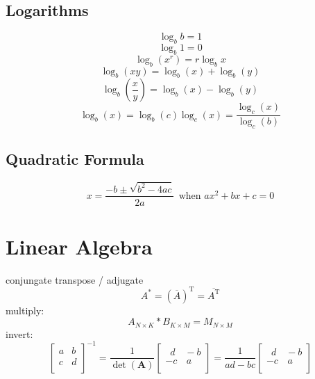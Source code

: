 \documentclass{article}
\begin{document}
	\subsection{Logarithms}	
		\begin{equation}
			\log _b b = 1
		\end{equation}
		\begin{equation}
			\log _b 1 = 0
		\end{equation}
		\begin{equation}
			\log _b (x^r) = r \log _b x
		\end{equation}
		\begin{equation}
			\log _b (xy) = \log _b (x) + \log _b (y)
		\end{equation}
		\begin{equation}
			\log _b \left( \frac{x}{y} \right) = \log _b (x) - \log _b (y)
		\end{equation}
		\begin{equation}
			\log _b \left( x \right) = \log _b \left( c \right)\log _c \left( x \right) = \frac{{\log _c \left( x \right)}}{{\log _c \left( b \right)}}
		\end{equation}
	\subsection{Quadratic Formula}
		\begin{equation}
			x = \frac{{ - b \pm \sqrt {b^2 - 4ac} }}{{2a}} \ \ \mbox{when $ax^2 + bx + c = 0$}
		\end{equation}
\section{Linear Algebra}
	conjungate transpose / adjugate 
	\begin{equation}
		A^* = (\overline{A})^\mathrm{T} = \overline{A^\mathrm{T}}
	\end{equation}
	multiply: 
	\begin{equation}
		A_{N \times K} * B_{K \times M} = M_{N \times M}
	\end{equation}
	invert: 
	\begin{equation}
		\begin{bmatrix}
			a & b \\ c & d \\ 
		\end{bmatrix}^{-1} =
		\frac{1}{\det(\mathbf{A})} 
		\begin{bmatrix}
			\,\,\,d & \!\!-b \\ -c & \,a \\ 
		\end{bmatrix} =
		\frac{1}{ad - bc} 
		\begin{bmatrix}
			\,\,\,d & \!\!-b \\ -c & \,a \\ 
		\end{bmatrix}
	\end{equation}
\end{document}
